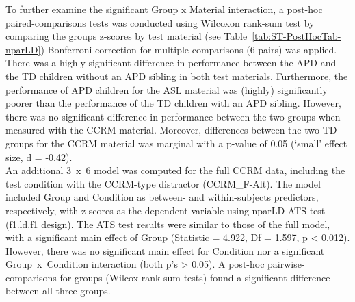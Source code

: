 \documentclass[a4paper, twoside]{templates/ociamthesis}
\begin{document}
To further examine the significant Group x Material interaction, a post-hoc paired-comparisons tests was conducted using Wilcoxon rank-sum test by comparing the groups z-scores by test material (see Table~\ref{tab:ST-PostHocTab-nparLD}) Bonferroni correction for multiple comparisons (6 pairs) was applied. There was a highly significant difference in performance between the APD and the TD children without an APD sibling in both test materials. Furthermore, the performance of APD children for the ASL material was (highly) significantly poorer than the performance of the TD children with an APD sibling. However, there was no significant difference in performance between the two groups when measured with the CCRM material. Moreover, differences between the two TD groups for the CCRM material was marginal with a p-value of 0.05 (`small' effect size, d = -0.42).\\

An additional 3~x~6 model was computed for the full CCRM data, including the test condition with the CCRM-type distractor (CCRM\_F-Alt). The model included Group and Condition as between- and within-subjects predictors, respectively, with z-scores as the dependent variable using nparLD ATS test (f1.ld.f1 design). The ATS test results were similar to those of the full model, with a significant main effect of Group (Statistic = 4.922, Df = 1.597, p \textless{} 0.012). However, there was no significant main effect for Condition nor a significant Group~x~Condition interaction (both p's \textgreater{} 0.05). A post-hoc pairwise-comparisons for groups (Wilcox rank-sum tests) found a significant difference between all three groups.\\
\end{document}

